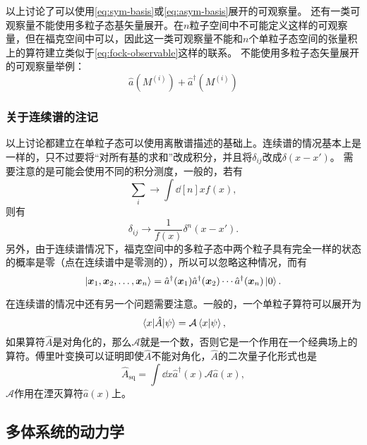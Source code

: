 \documentclass[hyperref, UTF8, a4paper]{ctexart}
\begin{document}
以上讨论了可以使用\eqref{eq:sym-basis}或\eqref{eq:asym-basis}展开的可观察量。
还有一类可观察量不能使用多粒子态基矢量展开。在$n$粒子空间中不可能定义这样的可观察量，但在福克空间中可以，因此这一类可观察量不能和$n$个单粒子态空间的张量积上的算符建立类似于\eqref{eq:fock-observable}这样的联系。
不能使用多粒子态矢量展开的可观察量举例：
\[
    \hat{a}(M^{(i)}) + \hat{a}^\dagger(M^{(i)})
\]

\subsubsection{关于连续谱的注记}

以上讨论都建立在单粒子态可以使用离散谱描述的基础上。连续谱的情况基本上是一样的，只不过要将“对所有基的求和”改成积分，并且将$\delta_{ij}$改成$\delta(x - x')$。
需要注意的是可能会使用不同的积分测度，一般的，若有
\[
    \sum_i \longrightarrow \int \dd[n]{x} f(x),
\]
则有
\[
    \delta_{ij} \longrightarrow \frac{1}{f(x)} \delta^n(x - x').
\]
另外，由于连续谱情况下，福克空间中的多粒子态中两个粒子具有完全一样的状态的概率是零（点在连续谱中是零测的），所以可以忽略这种情况，而有
\begin{equation}
    \ket{\vb*{x}_1, \vb*{x}_2, \ldots, \vb*{x}_n} = \hat{a}^\dagger(\vb*{x}_1) \hat{a}^\dagger(\vb*{x}_2) \cdots \hat{a}^\dagger (\vb*{x}_n ) \ket{0}.
\end{equation}

在连续谱的情况中还有另一个问题需要注意。一般的，一个单粒子算符可以展开为
\[
    \mel{x}{\hat{A}}{\psi} = \mathcal{A} \braket{x}{\psi},
\]
如果算符$\hat{A}$是对角化的，那么$\mathcal{A}$就是一个数，否则它是一个作用在一个经典场上的算符。傅里叶变换可以证明即使$\hat{A}$不能对角化，$\hat{A}$的二次量子化形式也是
\[
    \hat{A}_\text{sq} = \int \dd{x} \hat{a}^\dagger (x) \mathcal{A} \hat{a}(x), 
\]
$\mathcal{A}$作用在湮灭算符$\hat{a}(x)$上。

\subsection{多体系统的动力学}\label{sec:many-body-dynamics}

\end{document}
